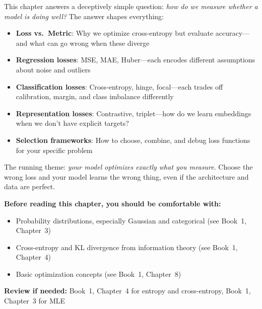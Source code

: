 \documentclass[../../main.tex]{subfiles}
\begin{document}
\begin{intuition}
This chapter answers a deceptively simple question: \textit{how do we measure whether a model is doing well?} The answer shapes everything:
\begin{itemize}
    \item \textbf{Loss vs.\ Metric}: Why we optimize cross-entropy but evaluate accuracy---and what can go wrong when these diverge
    \item \textbf{Regression losses}: MSE, MAE, Huber---each encodes different assumptions about noise and outliers
    \item \textbf{Classification losses}: Cross-entropy, hinge, focal---each trades off calibration, margin, and class imbalance differently
    \item \textbf{Representation losses}: Contrastive, triplet---how do we learn embeddings when we don't have explicit targets?
    \item \textbf{Selection frameworks}: How to choose, combine, and debug loss functions for your specific problem
\end{itemize}
The running theme: \textit{your model optimizes exactly what you measure}. Choose the wrong loss and your model learns the wrong thing, even if the architecture and data are perfect.
\end{intuition}

\begin{prerequisites}
\textbf{Before reading this chapter, you should be comfortable with:}
\begin{itemize}
    \item Probability distributions, especially Gaussian and categorical (see Book~1, Chapter~3)
    \item Cross-entropy and KL divergence from information theory (see Book~1, Chapter~4)
    \item Basic optimization concepts (see Book~1, Chapter~8)
\end{itemize}
\textbf{Review if needed:} Book~1, Chapter~4 for entropy and cross-entropy, Book~1, Chapter~3 for MLE
\end{prerequisites}
\end{document}

